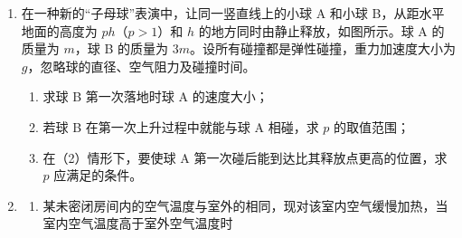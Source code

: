 \documentclass[\gkver]{gaokaozhenti}
\begin{document}
\begin{enumerate}


\item
在一种新的“子母球”表演中，让同一竖直线上的小球 A 和小球 B，从距水平地面的高度为 $ph$（$p>1$）和 $h$ 的地方同时由静止释放，如图所示。球 A 的质量为 $m$，球 B 的质量为 $3m$。设所有碰撞都是弹性碰撞，重力加速度大小为 $g$，忽略球的直径、空气阻力及碰撞时间。
\begin{enumerate}
	\item
	求球 B 第一次落地时球 A 的速度大小；
	\item
	若球 B 在第一次上升过程中就能与球 A 相碰，求 $p$ 的取值范围；
	\item
	在（2）情形下，要使球 A 第一次碰后能到达比其释放点更高的位置，求 $p$ 应满足的条件。
\end{enumerate}



\item
\begin{enumerate}
	\item
	某未密闭房间内的空气温度与室外的相同，现对该室内空气缓慢加热，当室内空气温度高于室外空气温度时


\end{enumerate}
\end{enumerate}
\end{document}
